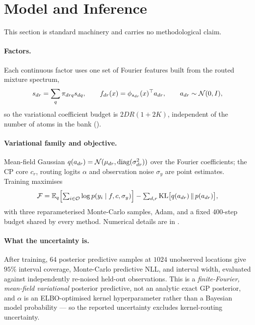 \section{Model and Inference}
\label{sec:inference}

This section is standard machinery and carries no methodological claim.

\paragraph{Factors.} Each continuous factor uses one set of Fourier features built from the
routed mixture spectrum,
\begin{equation}
  s_{dr} = \sum_q \pi_{drq} s_{dq},
  \qquad
  f_{dr}(x) = \phi_{s_{dr}}(x)^\top a_{dr},
  \qquad
  a_{dr} \sim \mathcal{N}(0, I),
  \label{eq:collapsed}
\end{equation}
so the variational coefficient budget is $2DR(1+2K)$, independent of the number of atoms in
the bank ().

\paragraph{Variational family and objective.} Mean-field Gaussian
$q(a_{dr}) = \mathcal{N}(\mu_{dr}, \operatorname{diag}(\sigma_{dr}^2))$ over the Fourier coefficients; the CP core
$c_r$, routing logits $\alpha$ and observation noise $\sigma_y$ are point estimates.  Training
maximises
\begin{equation}
  \mathcal{F} = \mathbb{E}_q\Bigl[\textstyle\sum_{i\in\mathcal{O}}\log p(y_i \mid f, c, \sigma_y)\Bigr]
  - \sum_{d,r}\mathrm{KL}\bigl[q(a_{dr}) \,\|\, p(a_{dr})\bigr],
  \label{eq:elbo}
\end{equation}
with three reparameterised Monte-Carlo samples, Adam, and a fixed 400-step budget shared by
every method.  Numerical details are in .

\paragraph{What the uncertainty is.} After training, $64$ posterior predictive samples at
$1024$ unobserved locations give $95\%$ interval coverage, Monte-Carlo predictive NLL, and
interval width, evaluated against independently re-noised held-out observations.  This is a
\emph{finite-Fourier, mean-field variational} posterior predictive, not an analytic exact GP
posterior, and $\alpha$ is an ELBO-optimised kernel hyperparameter rather than a Bayesian
model probability --- so the reported uncertainty excludes kernel-routing uncertainty.
